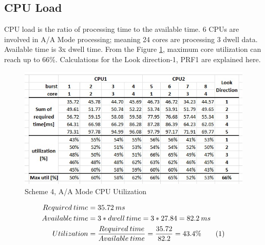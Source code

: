 \subsection{CPU Load}
\label{ss:mm:scheme4:cpu_load}
CPU load is the ratio of processing time to the available time. 6 CPUs are involved in A/A Mode processing; meaning 24 cores are processing 3 dwell data. Available time is 3x dwell time. From the Figure \ref{fig:mm:scheme4_util}, maximum core utilization can reach up to 66\%. Calculations for the Look direction-1, PRF1 are explained here.
\begin{figure}[h!]
	\centering
	\includegraphics[width=140mm]{figures/scheme4_util}
	\caption{Scheme 4, A/A Mode CPU Utilization}
	\label{fig:mm:scheme4_util}
\end{figure}

\begin{align*}
	Required \: time &= 35.72 \: ms \\
	Available \: time &= 3 * dwell \: time = 3 * 27.84 = 82.2\: ms \\
	Utilization &= \frac{Required \: time}{Available \: time} = \frac{35.72}{82.2} = 43.4\% \stepcounter{equation}\tag{\theequation}
\end{align*}


